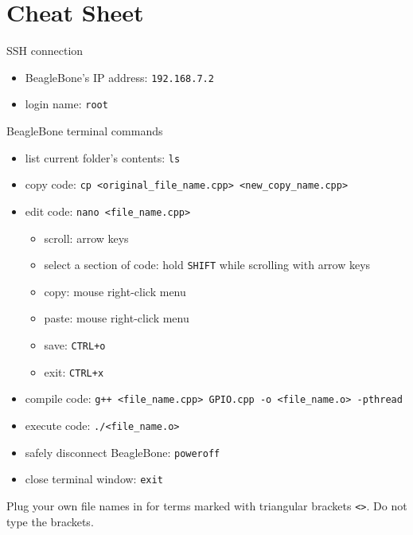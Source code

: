 \documentclass[11pt, letterpaper]{article}
\begin{document}
\part{Cheat Sheet}

SSH connection
\begin{itemize}
	\item BeagleBone's IP address: \texttt{192.168.7.2}
	\item login name: \texttt{root}
\end{itemize}

BeagleBone terminal commands
\begin{itemize}
	\item list current folder's contents: \texttt{ls}
	\item copy code: \texttt{cp <original\_file\_name.cpp> <new\_copy\_name.cpp>}
	\item edit code: \texttt{nano <file\_name.cpp>}
	\begin{itemize}
		\item scroll: arrow keys
		\item select a section of code: hold \texttt{SHIFT} while scrolling with arrow keys
		\item copy: mouse right-click menu
		\item paste: mouse right-click menu
		\item save: \texttt{CTRL+o}
		\item exit: \texttt{CTRL+x}
	\end{itemize}
	\item compile code: \texttt{g++ <file\_name.cpp> GPIO.cpp -o <file\_name.o> -pthread}
	\item execute code: \texttt{./<file\_name.o>}
	\item safely disconnect BeagleBone: \texttt{poweroff}
	\item close terminal window: \texttt{exit}
\end{itemize}
Plug your own file names in for terms marked with triangular brackets \texttt{<>}. Do not type the brackets.
\end{document}
